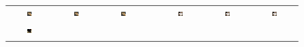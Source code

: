 \documentclass{article} %
\begin{document}
\begin{figure}[t]
\begin{minipage}{\textwidth}
{\begin{tabular}{ccccccc}
\includegraphics[width=0.17\textwidth]{figures/cat_1_gt} &
\includegraphics[width=0.17\textwidth]{figures/cat_1_sift} &
\includegraphics[width=0.17\textwidth]{figures/cat_1_conv} & &
\includegraphics[width=0.17\textwidth]{figures/cat_2_gt} &
\includegraphics[width=0.17\textwidth]{figures/cat_2_sift} &
\includegraphics[width=0.17\textwidth]{figures/cat_2_conv} \\
\includegraphics[width=0.17\textwidth]{figures/cow_1_gt} &

\end{tabular}}
\end{minipage}
\end{figure}
\end{document}
